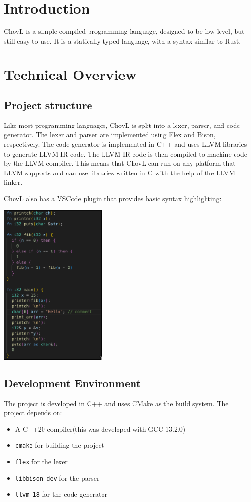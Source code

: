\section{Introduction}
ChovL is a simple compiled programming language, designed to be low-level, but still easy to use. It is a statically typed language, with a syntax similar to Rust.

\section{Technical Overview}
\subsection{Project structure}
Like most programming languages, ChovL is split into a lexer, parser, and code generator. The lexer and parser are implemented using Flex and Bison, respectively. The code generator is implemented in C++ and uses LLVM libraries to generate LLVM IR code. The LLVM IR code is then compiled to machine code by the LLVM compiler. This means that ChovL can run on any platform that LLVM supports and can use libraries written in C with the help of the LLVM linker.

ChovL also has a VSCode plugin that provides basic syntax highlighting:

\begin{center}
  \includegraphics[width=0.4\textwidth]{images/vscode.png}
\end{center}

\subsection{Development Environment}
The project is developed in C++ and uses CMake as the build system. The project depends on:
\begin{itemize}
  \item A C++20 compiler(this was developed with GCC 13.2.0)
  \item \texttt{cmake} for building the project
  \item \texttt{flex} for the lexer
  \item \texttt{libbison-dev} for the parser
  \item \texttt{llvm-18} for the code generator
\end{itemize}

